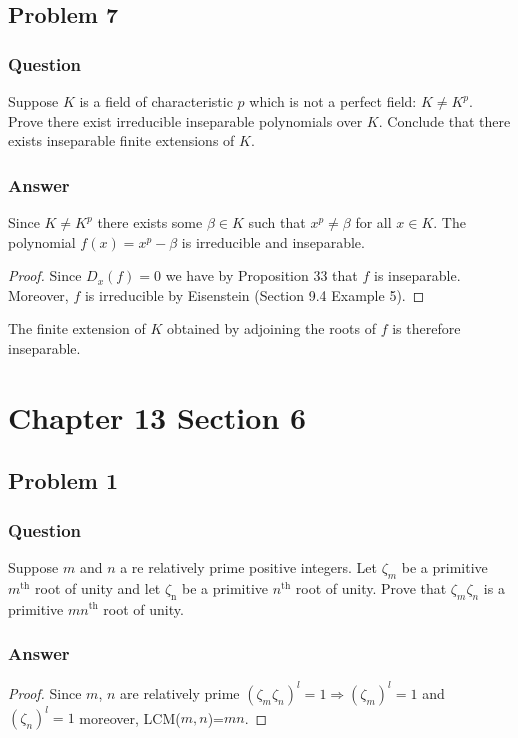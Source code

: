 \documentclass[10pt]{article}
\begin{document}
\subsection{Problem 7}
\subsubsection{Question}
Suppose $K$ is a field of characteristic $p$ which is not a perfect field: $K \neq K^p$. Prove there exist irreducible inseparable polynomials over $K$. Conclude that there exists inseparable finite extensions of $K$.
\subsubsection{Answer}
Since $K \neq K^p$ there exists some $\beta \in K$ such that $x^p \neq \beta$ for all $x \in K$. The polynomial $f(x) = x^p -\beta$ is irreducible and inseparable.
\begin{proof}
Since $D_x (f) = 0 $ we have by Proposition 33 that $f$ is inseparable. Moreover, $f$ is irreducible by Eisenstein (Section 9.4 Example 5).
\end{proof}

The finite extension of $K$ obtained by adjoining the roots of $f$ is therefore inseparable.


\section{Chapter 13 Section 6}
\subsection{Problem 1}
\subsubsection{Question}
Suppose $m$ and $n$ a re relatively prime positive integers. Let $\zeta_m$ be a primitive $m^\mathrm{th}$ root of unity and let $\zeta_\mathrm{n}$ be a primitive $n^\mathrm{th}$ root of unity. Prove that $\zeta_m \zeta_n$ is a primitive $mn^\mathrm{th}$ root of unity.
\subsubsection{Answer}
\begin{proof} Since $m$, $n$ are relatively prime $(\zeta_m \zeta_n)^l = 1\Rightarrow (\zeta_m)^l =1$ and $ (\zeta_n)^l=1$ moreover, LCM($m,n$)=$mn$. \end{proof}
\end{document}
